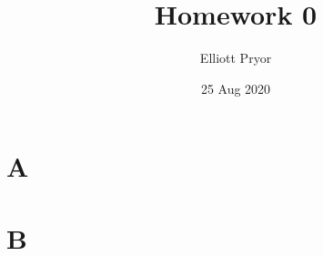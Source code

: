\documentclass[11pt]{article}
\title{Homework 0}
\author{Elliott Pryor}
\date{25 Aug 2020}
\begin{document}
\maketitle

\section*{A}







\section*{B}
\end{document}
